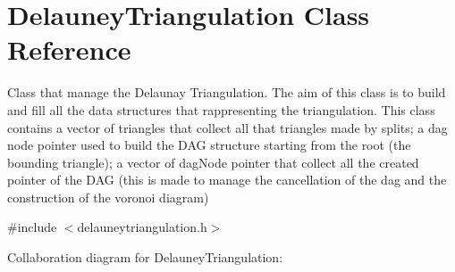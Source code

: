 \hypertarget{classDelauneyTriangulation}{}\section{Delauney\+Triangulation Class Reference}
\label{classDelauneyTriangulation}


Class that manage the Delaunay Triangulation. The aim of this class is to build and fill all the data structures that rappresenting the triangulation. This class contains a vector of triangles that collect all that triangles made by splits; a dag node pointer used to build the D\+AG structure starting from the root (the bounding triangle); a vector of dag\+Node pointer that collect all the created pointer of the D\+AG (this is made to manage the cancellation of the dag and the construction of the voronoi diagram)  




{\ttfamily \#include $<$delauneytriangulation.\+h$>$}



Collaboration diagram for Delauney\+Triangulation\+:

